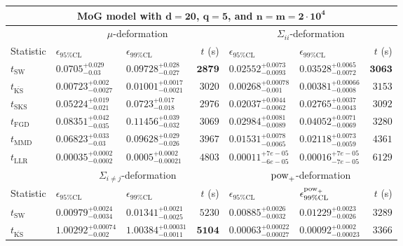 \begin{tabular}{l|llr|llr}
	\toprule
	\multicolumn{7}{c}{{\bf MoG model with $\mathbf{d=20}$, $\mathbf{q=5}$, and $\mathbf{n=m=2\cdot 10^{4}}$}} \\
	\toprule
	\multicolumn{1}{c}{} & \multicolumn{3}{c}{$\mu$-deformation} & \multicolumn{3}{c}{$\Sigma_{ii}$-deformation} \\
	Statistic & $\epsilon_{95\%\mathrm{CL}}$ & $\epsilon_{99\%\mathrm    {CL}}$ & $t$ (s) & $\epsilon_{95\%\mathrm{CL}}$ & $\epsilon_{99\%\mathrm{CL}}$ & $t$ (s) \\
	\midrule
	$t_{\mathrm{SW}}$ & $0.0705_{-0.03}^{+0.029}$ & $0.09728_{-0.027}^{+0.028}$ & ${\mathbf{2879}}$ & $0.02552_{-0.0093}^{+0.0073}$ & $0.03528_{-0.0072}^{+0.0065}$ & ${\mathbf{3063}}$ \\
	$t_{\overline{\mathrm{KS}}}$ & ${\mathbf{0.00723_{-0.0027}^{+0.002}}}$ & ${\mathbf{0.01001_{-0.0021}^{+0.0017}}}$ & $3020$ & ${\mathbf{0.00268_{-0.001}^{+0.00078}}}$ & ${\mathbf{0.00381_{-0.0008}^{+0.00066}}}$ & $3153$ \\
	$t_{\mathrm{SKS}}$ & $0.05224_{-0.021}^{+0.019}$ & $0.0723_{-0.018}^{+0.017}$ & $2976$ & $0.02037_{-0.0062}^{+0.0044}$ & $0.02765_{-0.0043}^{+0.0037}$ & $3092$ \\
	$t_{\mathrm{FGD}}$ & $0.08351_{-0.035}^{+0.042}$ & $0.11456_{-0.032}^{+0.039}$ & $3069$ & $0.02984_{-0.0089}^{+0.0081}$ & $0.04052_{-0.0069}^{+0.0071}$ & $3280$ \\
	$t_{\mathrm{MMD}}$ & $0.06823_{-0.03}^{+0.033}$ & $0.09628_{-0.026}^{+0.029}$ & $3967$ & $0.01531_{-0.0065}^{+0.0078}$ & $0.02118_{-0.0059}^{+0.0073}$ & $4361$ \\
	$t_{\mathrm{LLR}}$ & $0.00035_{-0.0002}^{+0.0002}$ & $0.0005_{-0.00021}^{+0.0002}$ & $4803$ & $0.00011_{-6e-05}^{+7e-05}$ & $0.00016_{-7e-05}^{+7e-05}$ & $6129$ \\
	\toprule
	\multicolumn{1}{c}{} & \multicolumn{3}{c}{$\Sigma_{i\neq j}$-deformation} & \multicolumn{3}{c}{$\rm{pow}_{+}$-deformation} \\
	Statistic & $\epsilon_{95\%\mathrm{CL}}$ & $\epsilon_{99\%\mathrm{CL}}$ & $t$ (s) & $\epsilon_{95\%\mathrm{CL}}$ & $\epsilon^{\rm   {pow}_{+}}_{99\%\mathrm{CL}}$ & $t$ (s) \\
	\midrule
	$t_{\mathrm{SW}}$ & $0.00979_{-0.0034}^{+0.0024}$ & $0.01341_{-0.0025}^{+0.0021}$ & $5230$ & $0.00885_{-0.0032}^{+0.0026}$ & $0.01229_{-0.0026}^{+0.0023}$ & $3289$ \\
	$t_{\overline{\mathrm{KS}}}$ & $1.00292_{-0.002}^{+0.00074}$ & $1.00384_{-0.0011}^{+0.00031}$ & ${\mathbf{5104}}$ & ${\mathbf{0.00063_{-0.00027}^{+0.00022}}}$ & ${\mathbf{0.00092_{-0.00023}^{+0.0002}}}$ & $3366$ \\

\end{tabular}
